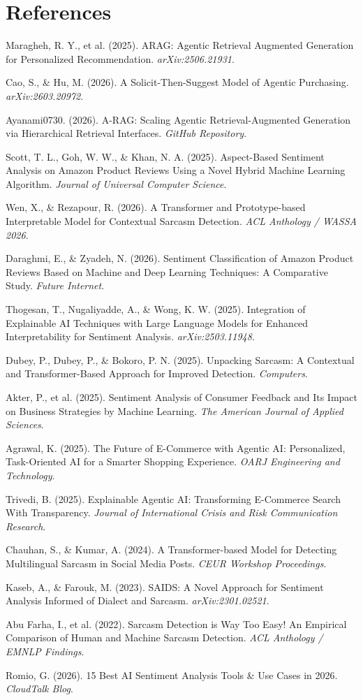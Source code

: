 \documentclass[11pt,oneside]{scrbook}
\begin{document}
\backmatter
\chapter{References}
\begin{enumerate}[label={[\arabic*]}]
\item Maragheh, R. Y., et al. (2025). ARAG: Agentic Retrieval Augmented Generation for Personalized Recommendation. \textit{arXiv:2506.21931}.
\item Cao, S., \& Hu, M. (2026). A Solicit-Then-Suggest Model of Agentic Purchasing. \textit{arXiv:2603.20972}.
\item Ayanami0730. (2026). A-RAG: Scaling Agentic Retrieval-Augmented Generation via Hierarchical Retrieval Interfaces. \textit{GitHub Repository}.
\item Scott, T. L., Goh, W. W., \& Khan, N. A. (2025). Aspect-Based Sentiment Analysis on Amazon Product Reviews Using a Novel Hybrid Machine Learning Algorithm. \textit{Journal of Universal Computer Science}.
\item Wen, X., \& Rezapour, R. (2026). A Transformer and Prototype-based Interpretable Model for Contextual Sarcasm Detection. \textit{ACL Anthology / WASSA 2026}.
\item Daraghmi, E., \& Zyadeh, N. (2026). Sentiment Classification of Amazon Product Reviews Based on Machine and Deep Learning Techniques: A Comparative Study. \textit{Future Internet}.
\item Thogesan, T., Nugaliyadde, A., \& Wong, K. W. (2025). Integration of Explainable AI Techniques with Large Language Models for Enhanced Interpretability for Sentiment Analysis. \textit{arXiv:2503.11948}.
\item Dubey, P., Dubey, P., \& Bokoro, P. N. (2025). Unpacking Sarcasm: A Contextual and Transformer-Based Approach for Improved Detection. \textit{Computers}.
\item Akter, P., et al. (2025). Sentiment Analysis of Consumer Feedback and Its Impact on Business Strategies by Machine Learning. \textit{The American Journal of Applied Sciences}.
\item Agrawal, K. (2025). The Future of E-Commerce with Agentic AI: Personalized, Task-Oriented AI for a Smarter Shopping Experience. \textit{OARJ Engineering and Technology}.
\item Trivedi, B. (2025). Explainable Agentic AI: Transforming E-Commerce Search With Transparency. \textit{Journal of International Crisis and Risk Communication Research}.
\item Chauhan, S., \& Kumar, A. (2024). A Transformer-based Model for Detecting Multilingual Sarcasm in Social Media Posts. \textit{CEUR Workshop Proceedings}.
\item Kaseb, A., \& Farouk, M. (2023). SAIDS: A Novel Approach for Sentiment Analysis Informed of Dialect and Sarcasm. \textit{arXiv:2301.02521}.
\item Abu Farha, I., et al. (2022). Sarcasm Detection is Way Too Easy! An Empirical Comparison of Human and Machine Sarcasm Detection. \textit{ACL Anthology / EMNLP Findings}.
\item Romio, G. (2026). 15 Best AI Sentiment Analysis Tools \& Use Cases in 2026. \textit{CloudTalk Blog}.
\end{enumerate}
\end{document}
